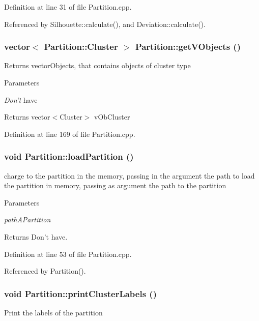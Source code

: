 Definition at line 31 of file Partition.cpp.

Referenced by Silhouette::calculate(), and Deviation::calculate().\hypertarget{classPartition_a9d6584bb879af33206176d912d8394d0}{
\subsubsection[{getVObjects}]{\setlength{\rightskip}{0pt plus 5cm}vector$<$ Partition::Cluster $>$ Partition::getVObjects ()}}
\label{classPartition_a9d6584bb879af33206176d912d8394d0}
Returns vectorObjects, that contains objects of cluster type 
\begin{DoxyParams}{Parameters}
\item[{\em Don't}]have \end{DoxyParams}
\begin{DoxyReturn}{Returns}
vector$<$Cluster$>$ vObCluster 
\end{DoxyReturn}


Definition at line 169 of file Partition.cpp.\hypertarget{classPartition_a025f8c250b2e7bb9d74ff18e6839105a}{
\subsubsection[{loadPartition}]{\setlength{\rightskip}{0pt plus 5cm}void Partition::loadPartition ()}}
\label{classPartition_a025f8c250b2e7bb9d74ff18e6839105a}
charge to the partition in the memory, passing in the argument the path to load the partition in memory, passing as argument the path to the partition 
\begin{DoxyParams}{Parameters}
\item[{\em pathAPartition}]\end{DoxyParams}
\begin{DoxyReturn}{Returns}
Don't have. 
\end{DoxyReturn}


Definition at line 53 of file Partition.cpp.

Referenced by Partition().\hypertarget{classPartition_a377ce02d44555898657ef992a1d4029a}{
\subsubsection[{printClusterLabels}]{\setlength{\rightskip}{0pt plus 5cm}void Partition::printClusterLabels ()}}
\label{classPartition_a377ce02d44555898657ef992a1d4029a}
Print the labels of the partition 

